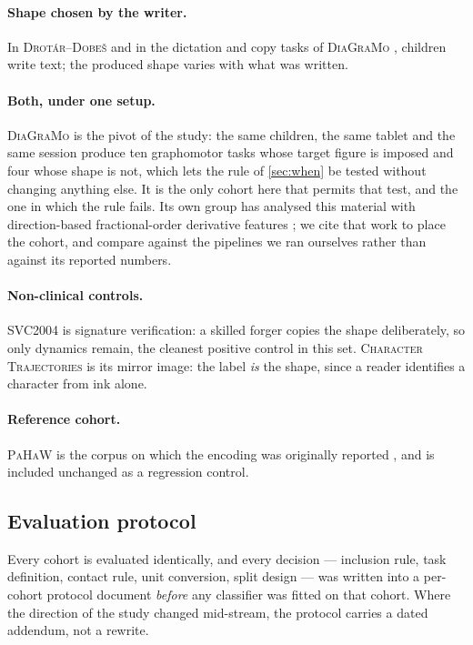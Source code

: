 \documentclass[10pt,a4paper]{article}
\begin{document}
\paragraph{Shape chosen by the writer.} In \textsc{Drot\'ar--Dobe\v{s}}
\citep{drotar2020dysgraphia} and in the dictation and copy tasks of \textsc{DiaGraMo}
\citep{zvoncakova2026diagramo}, children write text; the produced shape varies with what was
written.

\paragraph{Both, under one setup.} \textsc{DiaGraMo} is the pivot of the study: the same children,
the same tablet and the same session produce ten graphomotor tasks whose target figure is imposed
and four whose shape is not, which lets the rule of \cref{sec:when} be tested without
changing anything else. It is the only cohort here that permits that test, and the one in which the
rule fails. Its own group has analysed this material with
direction-based fractional-order derivative features \citep{gavenciak2025fractional}; we cite that
work to place the cohort, and compare against the pipelines we ran ourselves rather than against
its reported numbers.

\paragraph{Non-clinical controls.} \textsc{SVC2004} \citep{yeung2004svc} is signature
verification: a skilled forger copies the shape deliberately, so only dynamics remain, the
cleanest positive control in this set. \textsc{Character Trajectories}
\citep{williams2006chartraj} is its mirror image: the label \emph{is} the shape, since a reader
identifies a character from ink alone.

\paragraph{Reference cohort.} \textsc{PaHaW} \citep{drotar2016pahaw} is the corpus on which the
encoding was originally reported \citep{prior2027minimaps}, and is included unchanged as a
regression control.

\subsection{Evaluation protocol}
\label{sec:protocol}


Every cohort is evaluated identically, and every decision --- inclusion rule, task definition,
contact rule, unit conversion, split design --- was written into a per-cohort protocol document
\emph{before} any classifier was fitted on that cohort. Where the direction of the study changed
mid-stream, the protocol carries a dated addendum, not a rewrite.
\end{document}
